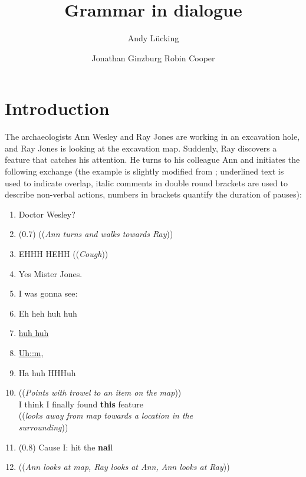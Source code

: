 \documentclass[output=paper
 	        ,biblatex
                ,babelshorthands
                ,newtxmath
                ,draftmode
                ,colorlinks, citecolor=brown
]{langscibook}
\author{%
	Andy Lücking\affiliation{Université de Paris, Goethe-Universität Frankfurt}%
	\and Jonathan Ginzburg\affiliation{Université de Paris}%
	\lastand Robin Cooper\affiliation{G\"{o}teborgs Universitet}%
}
\title{Grammar in dialogue}
\begin{document}
\maketitle
\label{chap-pragmatics}


\section{Introduction} 
\label{sec:introduction}

The archaeologists Ann Wesley and Ray Jones are working in an excavation hole, and Ray Jones is looking at the excavation map.
%
Suddenly, Ray discovers a feature that catches his attention. %
He turns to his colleague Ann and initiates the following exchange (the example is slightly modified from \citealt[]{Goodwin:2003}; underlined text is used to indicate overlap, italic comments in double round brackets are used to describe non-verbal actions, numbers in brackets quantify the duration of pauses):
%
\ea \label{ex:ann-ray}
\begin{enumerate}[noitemsep]
    \item {} Doctor Wesley?
    \item \speaking{} \quad (0.7) ((\textit{Ann turns and walks towards Ray}))
    \item {} EHHH HEHH ((\textit{Cough}))
    \item \speaking{} Yes Mister Jones.
    \item {} I was gonna see:
    \item {} \textdegree Eh heh huh huh
    \item \speaking{}  \underline{huh huh}
    \item {}  \underline{Uh::m},
    \item {} Ha huh HHHuh
    \item {} ((\textit{Points with trowel to an item on the map})) \\ 
    \speaking{} I think I finally found \textbf{this} feature \\
    \speaking{} ((\textit{looks away from map towards a location in the}\\ \speaking{} \textit{surrounding}))
    \item \speaking{} (0.8) Cause I: hit the \textbf{nai}l
    \item ((\textit{Ann looks at map, Ray looks at Ann, Ann looks at Ray}))
\end{enumerate}
\z
\end{document}
